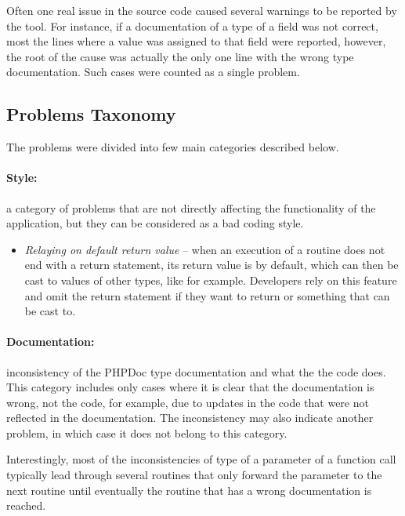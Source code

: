 Often one real issue in the source code caused several 
warnings to be reported by the tool. For instance, if a documentation 
of a type of a field was not correct, most the lines where 
a value was assigned to that field were reported, however, the 
root of the cause was actually the only one line with the 
wrong type documentation. Such cases were counted as a 
single problem.

\subsection{Problems Taxonomy}

The problems were divided into few main categories 
described below.

\paragraph*{Style:} a category of problems that 
are not directly affecting the functionality of the 
application, but they can be considered as a bad 
coding style. 

\begin{itemize}
    \item[] \textit{Relaying on default return value} -- when an execution of a 
        routine does not end with a return statement, its 
        return value is  by default, which can then 
        be cast to values of other types, like  
        for example. Developers rely on this feature and omit 
        the return statement if they want to return  or 
        something that  can be cast to.
\end{itemize}

\paragraph*{Documentation:} inconsistency of the PHPDoc type 
documentation and what the the code does. This category includes 
only cases where it is clear that the documentation is wrong, not the code, 
for example, due to updates in the code that were not reflected 
in the documentation. The inconsistency may also indicate 
another problem, in which case it does not belong to this category. 

Interestingly, most of the inconsistencies of type of a parameter 
of a function call typically lead through several routines that 
only forward the parameter to the next routine until 
eventually the routine that has a wrong documentation is reached.

